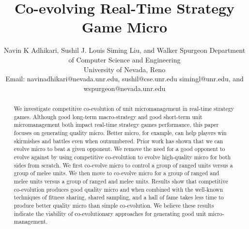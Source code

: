 \documentclass[conference,10pt]{IEEEtran}
\begin{document}
%
%
\title
  {
    Co-evolving Real-Time Strategy Game Micro 
  }

%
%
\author
  {
	  \IEEEauthorblockN
    {
    Navin K Adhikari,
    Sushil J. Louis  
    Siming Liu, and
    Walker Spurgeon
    }
    \IEEEauthorblockA
    {
    Department of Computer Science and Engineering                      \\
    University of Nevada, Reno                                          \\
    Email:                                        %
    navinadhikari@nevada.unr.edu,  %
    sushil@cse.unr.edu
    simingl@unr.edu, and
    wspurgeon@nevada.unr.edu
    }
  }
%
\maketitle
%
%
\begin{abstract}

We investigate competitive co-evolution of unit micromanagement in
real-time strategy games. Although good long-term macro-strategy and
good short-term unit micromanagement both impact real-time strategy
games performance, this paper focuses on generating quality
micro. Better micro, for example, can help players win skirmishes and
battles even when outnumbered. Prior work has shown that we can evolve
micro to beat a given opponent. We remove the need for a good opponent
to evolve against by using competitive co-evolution to evolve
high-quality micro for both sides from scratch. We first co-evolve
micro to control a group of ranged units versus a group of melee
units. We then move to co-evolve micro for a group of ranged and melee
units versus a group of ranged and melee units. Results show that
competitive co-evolution produces good quality micro and when combined
with the well-known techniques of fitness sharing, shared sampling,
and a hall of fame takes less time to produce better quality micro
than simple co-evolution. We believe these results indicate the
viability of co-evolutionary approaches for generating good unit
micro-management.



\end{abstract}
\end{document}
